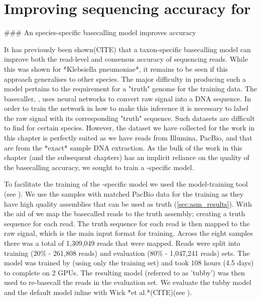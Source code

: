 \chapter{Improving \ont{} sequencing accuracy for \mtb{}}
\label{chap:tubby}
\begin{markdown}


### An \mtb{} species-specific \ont{} basecalling model improves accuracy

It has previously been shown(CITE) that a taxon-specific basecalling model can improve both the read-level and consensus accuracy of \ont{} sequencing reads. While this was shown for *Klebsiella pneumoniae*, it remains to be seen if this approach generalises to other species. The major difficulty in producing such a model pertains to the requirement for a "truth" genome for the training data. The \ont{} basecaller, \guppy{}, uses neural networks to convert raw signal into a DNA sequence. In order to train the network in how to make this inference it is necessary to label the raw signal with its corresponding "truth" sequence. Such datasets are difficult to find for certain species. However, the dataset we have collected for the work in this chapter is perfectly suited as we have reads from Illumina, PacBio, and \ont{} that are from the *exact* sample DNA extraction. As the bulk of the work in this chapter (and the subsequent chapters) has an implicit reliance on the quality of the \ont{} basecalling accuracy, we sought to train a \mtb{}-specific \guppy{} model.  

To facilitate the training of the \mtb{}-specific model we used the \ont{} model-training tool \taiyaki{} (see ). We use the samples with matched PacBio data for the training as they have high quality assemblies that can be used as truth (\autoref{sec:asm_results}). With the aid of \taiyaki{} we map the basecalled \ont{} reads to the truth assembly; creating a truth sequence for each read. The truth sequence for each read is then mapped to the raw signal, which is the main input format for training. Across the eight samples there was a total of 1,309,049 \ont{} reads that were mapped. Reads were split into training (20\% - 261,808 reads) and evaluation (80\% - 1,047,241 reads) sets. The model was trained by \taiyaki{} (using only the training set) and took 108 hours (4.5 days) to complete on 2 GPUs. The resulting \mtb{} model (referred to as 'tubby') was then used to re-basecall the reads in the evaluation set. We evaluate the tubby model and the default \guppy{} model inline with Wick *et al.*(CITE)(see ).


\end{markdown}
